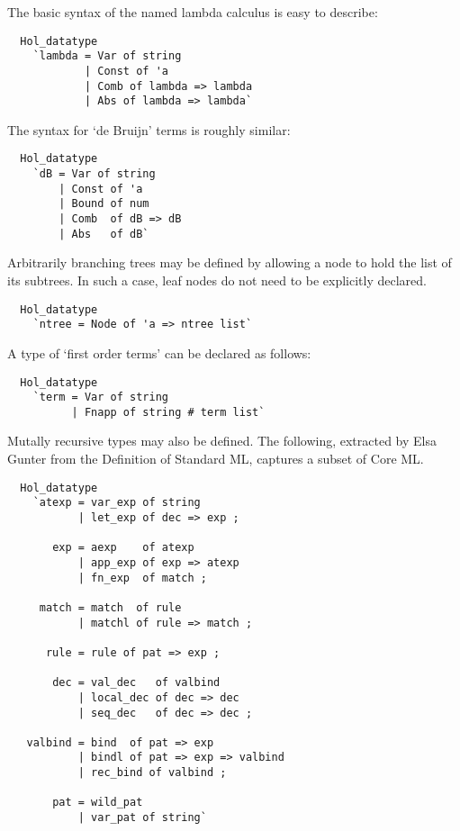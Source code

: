 The basic syntax of the named lambda calculus is easy to describe:
%
\begin{hol}
\begin{verbatim}
  Hol_datatype
    `lambda = Var of string
            | Const of 'a
            | Comb of lambda => lambda
            | Abs of lambda => lambda`
\end{verbatim}
\end{hol}
%
The syntax for `de Bruijn' terms is roughly similar:
%
\begin{hol}
\begin{verbatim}
  Hol_datatype
    `dB = Var of string
        | Const of 'a
        | Bound of num
        | Comb  of dB => dB
        | Abs   of dB`
\end{verbatim}
\end{hol}
%
Arbitrarily branching trees may be defined by allowing a node to hold
the list of its subtrees. In such a case, leaf nodes do not need to be
explicitly declared.
%
\begin{hol}
\begin{verbatim}
  Hol_datatype
    `ntree = Node of 'a => ntree list`
\end{verbatim}
\end{hol}
%
A type of `first order terms' can be declared as follows:
%
\begin{hol}
\begin{verbatim}
  Hol_datatype
    `term = Var of string
          | Fnapp of string # term list`
\end{verbatim}
\end{hol}
%
Mutally recursive types may also be defined. The following, extracted by
Elsa Gunter from the Definition of Standard ML, captures a subset of
Core ML.
%
\begin{hol}
\begin{verbatim}
  Hol_datatype
    `atexp = var_exp of string
           | let_exp of dec => exp ;

       exp = aexp    of atexp
           | app_exp of exp => atexp
           | fn_exp  of match ;

     match = match  of rule
           | matchl of rule => match ;

      rule = rule of pat => exp ;

       dec = val_dec   of valbind
           | local_dec of dec => dec
           | seq_dec   of dec => dec ;

   valbind = bind  of pat => exp
           | bindl of pat => exp => valbind
           | rec_bind of valbind ;

       pat = wild_pat
           | var_pat of string`
\end{verbatim}
\end{hol}
